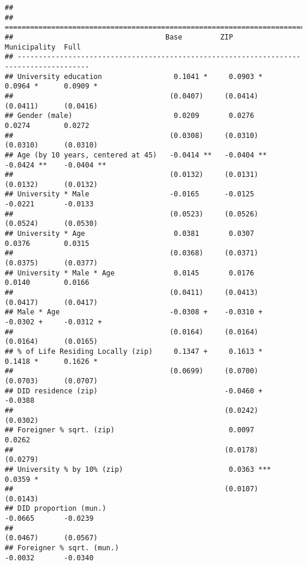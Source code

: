 \documentclass[
]{article}
\begin{document}
\begin{verbatim}
## 
## =======================================================================================
##                                    Base         ZIP           Municipality  Full       
## ---------------------------------------------------------------------------------------
## University education                 0.1041 *     0.0903 *      0.0964 *      0.0909 * 
##                                     (0.0407)     (0.0414)      (0.0411)      (0.0416)  
## Gender (male)                        0.0209       0.0276        0.0274        0.0272   
##                                     (0.0308)     (0.0310)      (0.0310)      (0.0310)  
## Age (by 10 years, centered at 45)   -0.0414 **   -0.0404 **    -0.0424 **    -0.0404 **
##                                     (0.0132)     (0.0131)      (0.0132)      (0.0132)  
## University * Male                   -0.0165      -0.0125       -0.0221       -0.0133   
##                                     (0.0523)     (0.0526)      (0.0524)      (0.0530)  
## University * Age                     0.0381       0.0307        0.0376        0.0315   
##                                     (0.0368)     (0.0371)      (0.0375)      (0.0377)  
## University * Male * Age              0.0145       0.0176        0.0140        0.0166   
##                                     (0.0411)     (0.0413)      (0.0417)      (0.0417)  
## Male * Age                          -0.0308 +    -0.0310 +     -0.0302 +     -0.0312 + 
##                                     (0.0164)     (0.0164)      (0.0164)      (0.0165)  
## % of Life Residing Locally (zip)     0.1347 +     0.1613 *      0.1418 *      0.1626 * 
##                                     (0.0699)     (0.0700)      (0.0703)      (0.0707)  
## DID residence (zip)                              -0.0460 +                   -0.0388   
##                                                  (0.0242)                    (0.0302)  
## Foreigner % sqrt. (zip)                           0.0097                      0.0262   
##                                                  (0.0178)                    (0.0279)  
## University % by 10% (zip)                         0.0363 ***                  0.0359 * 
##                                                  (0.0107)                    (0.0143)  
## DID proportion (mun.)                                          -0.0665       -0.0239   
##                                                                (0.0467)      (0.0567)  
## Foreigner % sqrt. (mun.)                                       -0.0032       -0.0340   

\end{verbatim}
\end{document}
